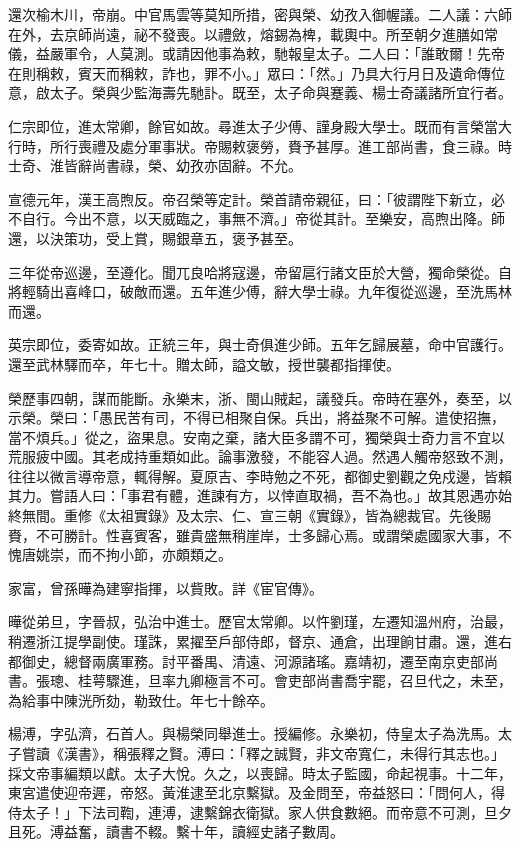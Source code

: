 \begin{pinyinscope}
還次榆木川，帝崩。中官馬雲等莫知所措，密與榮、幼孜入御幄議。二人議：六師在外，去京師尚遠，祕不發喪。以禮斂，熔錫為椑，載輿中。所至朝夕進膳如常儀，益嚴軍令，人莫測。或請因他事為敕，馳報皇太子。二人曰：「誰敢爾！先帝在則稱敕，賓天而稱敕，詐也，罪不小。」眾曰：「然。」乃具大行月日及遺命傳位意，啟太子。榮與少監海壽先馳訃。既至，太子命與蹇義、楊士奇議諸所宜行者。

仁宗即位，進太常卿，餘官如故。尋進太子少傅、謹身殿大學士。既而有言榮當大行時，所行喪禮及處分軍事狀。帝賜敕褒勞，賚予甚厚。進工部尚書，食三祿。時士奇、淮皆辭尚書祿，榮、幼孜亦固辭。不允。

宣德元年，漢王高煦反。帝召榮等定計。榮首請帝親征，曰：「彼謂陛下新立，必不自行。今出不意，以天威臨之，事無不濟。」帝從其計。至樂安，高煦出降。師還，以決策功，受上賞，賜銀章五，褒予甚至。

三年從帝巡邊，至遵化。聞兀良哈將寇邊，帝留扈行諸文臣於大營，獨命榮從。自將輕騎出喜峰口，破敵而還。五年進少傅，辭大學士祿。九年復從巡邊，至洗馬林而還。

英宗即位，委寄如故。正統三年，與士奇俱進少師。五年乞歸展墓，命中官護行。還至武林驛而卒，年七十。贈太師，謚文敏，授世襲都指揮使。

榮歷事四朝，謀而能斷。永樂末，浙、閩山賊起，議發兵。帝時在塞外，奏至，以示榮。榮曰：「愚民苦有司，不得已相聚自保。兵出，將益聚不可解。遣使招撫，當不煩兵。」從之，盜果息。安南之棄，諸大臣多謂不可，獨榮與士奇力言不宜以荒服疲中國。其老成持重類如此。論事激發，不能容人過。然遇人觸帝怒致不測，往往以微言導帝意，輒得解。夏原吉、李時勉之不死，都御史劉觀之免戍邊，皆賴其力。嘗語人曰：「事君有體，進諫有方，以悻直取禍，吾不為也。」故其恩遇亦始終無間。重修《太祖實錄》及太宗、仁、宣三朝《實錄》，皆為總裁官。先後賜賚，不可勝計。性喜賓客，雖貴盛無稍崖岸，士多歸心焉。或謂榮處國家大事，不愧唐姚崇，而不拘小節，亦頗類之。

家富，曾孫曄為建寧指揮，以貲敗。詳《宦官傳》。

曄從弟旦，字晉叔，弘治中進士。歷官太常卿。以忤劉瑾，左遷知溫州府，治最，稍遷浙江提學副使。瑾誅，累擢至戶部侍郎，督京、通倉，出理餉甘肅。還，進右都御史，總督兩廣軍務。討平番禺、清遠、河源諸瑤。嘉靖初，遷至南京吏部尚書。張璁、桂萼驟進，旦率九卿極言不可。會吏部尚書喬宇罷，召旦代之，未至，為給事中陳洸所劾，勒致仕。年七十餘卒。

楊溥，字弘濟，石首人。與楊榮同舉進士。授編修。永樂初，侍皇太子為洗馬。太子嘗讀《漢書》，稱張釋之賢。溥曰：「釋之誠賢，非文帝寬仁，未得行其志也。」採文帝事編類以獻。太子大悅。久之，以喪歸。時太子監國，命起視事。十二年，東宮遣使迎帝遲，帝怒。黃淮逮至北京繫獄。及金問至，帝益怒曰：「問何人，得侍太子！」下法司鞫，連溥，逮繫錦衣衛獄。家人供食數絕。而帝意不可測，旦夕且死。溥益奮，讀書不輟。繫十年，讀經史諸子數周。


\end{pinyinscope}
